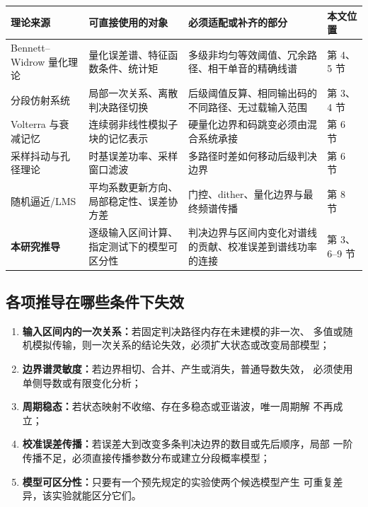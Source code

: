 \documentclass[11pt,a4paper]{ctexart}
\theoremstyle{adcplain}
\theoremstyle{definition}
\begin{document}
\begingroup
\small
\setlength{\tabcolsep}{3.5pt}
\begin{longtable}{
>{\raggedright\arraybackslash}p{28mm}
>{\raggedright\arraybackslash}p{40mm}
>{\raggedright\arraybackslash}p{46mm}
>{\raggedright\arraybackslash}p{26mm}}
\toprule
理论来源 & 可直接使用的对象 & 必须适配或补齐的部分 & 本文位置 \\
\midrule
\endhead
Bennett--Widrow 量化理论 &
量化误差谱、特征函数条件、统计矩 &
多级非均匀等效阈值、冗余路径、相干单音的精确线谱 &
第 4、5 节 \\
分段仿射系统 &
局部一次关系、离散判决路径切换 &
后级阈值反算、相同输出码的不同路径、无过载输入范围 &
第 3、4 节 \\
Volterra 与衰减记忆 &
连续弱非线性模拟子块的记忆表示 &
硬量化边界和码跳变必须由混合系统承接 &
第 6 节 \\
采样抖动与孔径理论 &
时基误差功率、采样窗口滤波 &
多路径时差如何移动后级判决边界 &
第 6 节 \\
随机逼近/LMS &
平均系数更新方向、局部稳定性、误差协方差 &
门控、dither、量化边界与最终频谱传播 &
第 8 节 \\
\textbf{本研究推导} &
逐级输入区间计算、指定测试下的模型可区分性 &
判决边界与区间内变化对谱线的贡献、校准误差到谱线功率的连接 &
第 3、6--9 节 \\
\bottomrule
\end{longtable}
\endgroup

\subsection{各项推导在哪些条件下失效}

\begin{enumerate}
  \item \textbf{输入区间内的一次关系：}若固定判决路径内存在未建模的非一次、
        多值或随机模拟传输，则一次关系的结论失效，必须扩大状态或改变局部模型；
  \item \textbf{边界谱灵敏度：}若边界相切、合并、产生或消失，普通导数失效，
        必须使用单侧导数或有限变化分析；
  \item \textbf{周期稳态：}若状态映射不收缩、存在多稳态或亚谐波，唯一周期解
        不再成立；
  \item \textbf{校准误差传播：}若误差大到改变多条判决边界的数目或先后顺序，局部
        一阶传播不足，必须直接传播参数分布或建立分段概率模型；
  \item \textbf{模型可区分性：}只要有一个预先规定的实验使两个候选模型产生
        可重复差异，该实验就能区分它们。
\end{enumerate}
\end{document}
